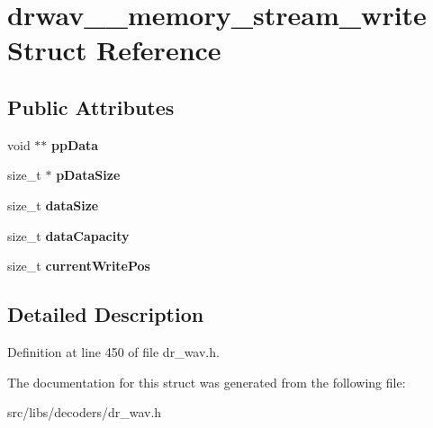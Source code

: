 \hypertarget{structdrwav____memory__stream__write}{\section{drwav\-\_\-\-\_\-memory\-\_\-stream\-\_\-write Struct Reference}
\label{structdrwav____memory__stream__write}
}
\subsection*{Public Attributes}
\begin{DoxyCompactItemize}
\item 
\hypertarget{structdrwav____memory__stream__write_a52e615403f5f708d532c02c2210df110}{void $\ast$$\ast$ {\bfseries pp\-Data}}\label{structdrwav____memory__stream__write_a52e615403f5f708d532c02c2210df110}

\item 
\hypertarget{structdrwav____memory__stream__write_ab64d5a1522f344b5ea001d783fac8051}{size\-\_\-t $\ast$ {\bfseries p\-Data\-Size}}\label{structdrwav____memory__stream__write_ab64d5a1522f344b5ea001d783fac8051}

\item 
\hypertarget{structdrwav____memory__stream__write_a9e01cbf6578e9f2b92b7ea7021078c71}{size\-\_\-t {\bfseries data\-Size}}\label{structdrwav____memory__stream__write_a9e01cbf6578e9f2b92b7ea7021078c71}

\item 
\hypertarget{structdrwav____memory__stream__write_a9101d09c995e2934734d86313659d262}{size\-\_\-t {\bfseries data\-Capacity}}\label{structdrwav____memory__stream__write_a9101d09c995e2934734d86313659d262}

\item 
\hypertarget{structdrwav____memory__stream__write_ac65a0c98d3a2e7d504247c73168bd088}{size\-\_\-t {\bfseries current\-Write\-Pos}}\label{structdrwav____memory__stream__write_ac65a0c98d3a2e7d504247c73168bd088}

\end{DoxyCompactItemize}


\subsection{Detailed Description}


Definition at line 450 of file dr\-\_\-wav.\-h.



The documentation for this struct was generated from the following file\-:\begin{DoxyCompactItemize}
\item 
src/libs/decoders/dr\-\_\-wav.\-h\end{DoxyCompactItemize}
